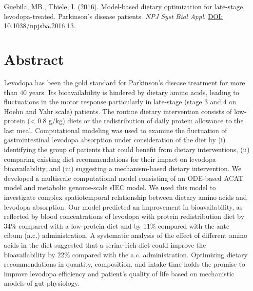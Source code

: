 { Guebila, MB., Thiele, I. (2016). Model-based dietary optimization for late-stage, levodopa-treated, Parkinson's disease patients. \textit{NPJ Syst Biol Appl}. \href{https://www.nature.com/articles/npjsba201613}{DOI: 10.1038/npjsba.2016.13.}  \par}%
\section*{Abstract}
{  
Levodopa has been the gold standard for Parkinson’s disease treatment for more than 40 years. Its bioavailability is hindered by dietary amino acids, leading to fluctuations in the motor response particularly in late-stage (stage 3 and 4 on Hoehn and Yahr scale) patients. The routine dietary intervention consists of low-protein (< 0.8 g/kg) diets or the redistribution of daily protein allowance to the last meal. Computational modeling was used to examine the fluctuation of gastrointestinal levodopa absorption under consideration of the diet by (i) identifying the group of patients that could benefit from dietary interventions, (ii) comparing existing diet recommendations for their impact on levodopa bioavailability, and (iii) suggesting a mechanism-based dietary intervention.
We developed a multiscale computational model consisting of an ODE-based ACAT model and metabolic genome-scale sIEC model. We used this model to investigate complex spatiotemporal relationship between dietary amino acids and levodopa absorption. Our model predicted an improvement in bioavailability, as reflected by blood concentrations of levodopa with protein redistribution diet by 34\% compared with a low-protein diet and by 11\% compared with the ante cibum (a.c.) administration. A systematic analysis of the effect of different amino acids in the diet suggested that a serine-rich diet could improve the bioavailability by 22\% compared with the a.c. administration. Optimizing dietary recommendations in quantity, composition, and intake time holds the promise to improve levodopa efficiency and patient’s quality of life based on mechanistic models of gut physiology.
\par}%

\newpage

